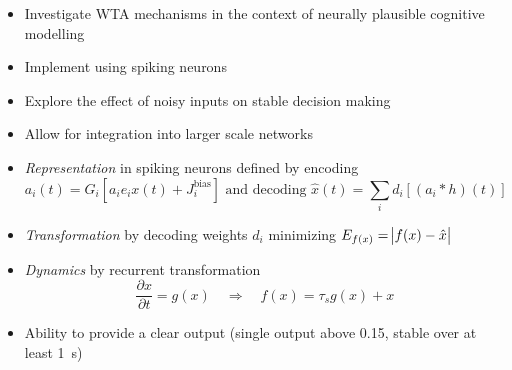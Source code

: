 \documentclass[final]{beamer}
\begin{document}
\begin{frame}[t]
    \begin{tcbraster}[raster columns=4, raster column skip=10mm, raster row skip=10mm, raster equal height=rows, raster force size=false]
        \begin{tcolorbox}[title=Motivation, add to width=-5cm]
            \begin{itemize}
                \item Investigate WTA mechanisms in the context of neurally plausible cognitive modelling
                \item Implement using spiking neurons
                \item Explore the effect of noisy inputs on stable decision making
                \item Allow for integration into larger scale networks
            \end{itemize}
        \end{tcolorbox}
        \begin{tcolorbox}[title=Neural Engineering Framework, add to width=13cm]
            \begin{itemize}
                \item \emph{Representation} in spiking neurons defined by encoding
                    \begin{equation*}
                        a_i(t) = G_i\left[a_i e_i x(t) + J_i^{\mathrm{bias}} \right]
                        \text{ and decoding }
                        \hat{x}(t) = \sum_i d_i \left[(a_i * h)(t) \right]
                    \end{equation*}
                \item \emph{Transformation} by decoding weights $d_i$ minimizing $E_{f(x)} = \abs{f(x) - \hat{x}}$
                \item \emph{Dynamics} by recurrent transformation
                    \begin{equation*}
                        \frac{\partial x}{\partial t} = g(x) \quad\Rightarrow\quad f(x) = \tau_s g(x) + x
                    \end{equation*}
            \end{itemize}
        \end{tcolorbox}
        \begin{tcolorbox}[title=Benchmarks, add to width=-5cm]
            \begin{itemize}
                \item Ability to provide a clear output (single output above \num{0.15}, stable over at least \SI{1}{\second})

\end{itemize}
\end{tcolorbox}
\end{tcbraster}
\end{frame}
\end{document}
